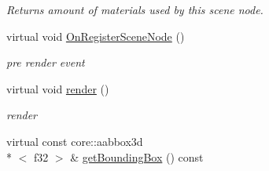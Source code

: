 \begin{DoxyCompactItemize}
\begin{DoxyCompactList}\small\item\em Returns amount of materials used by this scene node. \end{DoxyCompactList}\item 
\hypertarget{classirr_1_1scene_1_1_c_particle_system_scene_node_a772158bb9fce899231f794a93a8ae290}{virtual void \hyperlink{classirr_1_1scene_1_1_c_particle_system_scene_node_a772158bb9fce899231f794a93a8ae290}{On\-Register\-Scene\-Node} ()}\label{classirr_1_1scene_1_1_c_particle_system_scene_node_a772158bb9fce899231f794a93a8ae290}

\begin{DoxyCompactList}\small\item\em pre render event \end{DoxyCompactList}\item 
\hypertarget{classirr_1_1scene_1_1_c_particle_system_scene_node_ab3bc21a1447bd37a2232fdd9688ef446}{virtual void \hyperlink{classirr_1_1scene_1_1_c_particle_system_scene_node_ab3bc21a1447bd37a2232fdd9688ef446}{render} ()}\label{classirr_1_1scene_1_1_c_particle_system_scene_node_ab3bc21a1447bd37a2232fdd9688ef446}

\begin{DoxyCompactList}\small\item\em render \end{DoxyCompactList}\item 
\hypertarget{classirr_1_1scene_1_1_c_particle_system_scene_node_aa1cd6ce30368c4d80707af2e9f83ce2d}{virtual const core\-::aabbox3d\\*
$<$ f32 $>$ \& \hyperlink{classirr_1_1scene_1_1_c_particle_system_scene_node_aa1cd6ce30368c4d80707af2e9f83ce2d}{get\-Bounding\-Box} () const }\label{classirr_1_1scene_1_1_c_particle_system_scene_node_aa1cd6ce30368c4d80707af2e9f83ce2d}


\end{DoxyCompactItemize}
